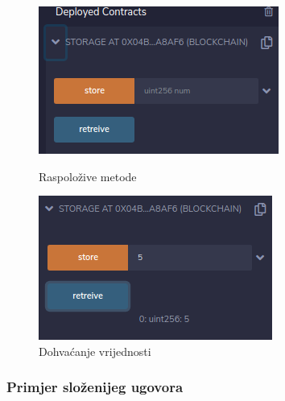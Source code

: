 \documentclass[times, utf8, zavrsni]{fer}
\begin{document}
\begin{figure}[ht]
  \centering
  \begin{minipage}[b]{0.4\textwidth}
    \includegraphics[width=\textwidth]{remixfunctions.png}
    \caption{Raspoložive metode}
  \end{minipage}
  \hfill
  \begin{minipage}[b]{0.4\textwidth}
    \includegraphics[width=\textwidth]{number5retreived.png}
    \caption{Dohvaćanje vrijednosti}
  \end{minipage}
\end{figure}

\subsubsection{Primjer složenijeg ugovora}
\end{document}
